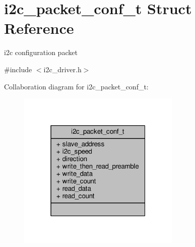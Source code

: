 \hypertarget{structi2c__packet__conf__t}{\section{i2c\+\_\+packet\+\_\+conf\+\_\+t Struct Reference}
\label{structi2c__packet__conf__t}
}


i2c configuration packet  




{\ttfamily \#include $<$i2c\+\_\+driver.\+h$>$}



Collaboration diagram for i2c\+\_\+packet\+\_\+conf\+\_\+t\+:
\nopagebreak
\begin{figure}[H]
\begin{center}
\leavevmode
\includegraphics[width=220pt]{structi2c__packet__conf__t__coll__graph}
\end{center}
\end{figure}
